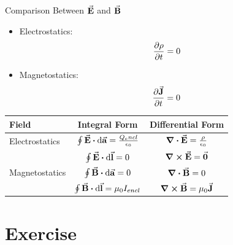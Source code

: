 \documentclass{beamer}
\begin{document}
\begin{frame}{Comparison Between $\va{E}$ and $\va{B}$}
    \begin{itemize}
        \item Electrostatics:
        \begin{equation}
            \pdv{\rho}{t} = 0
        \end{equation}
        \item Magnetostatics:
        \begin{equation}
            \pdv{\va{J}}{t} = 0
        \end{equation}
    \end{itemize}
    \begin{table}[htbp]
        \centering
        \begin{tabular}{lcc}
            \toprule
            Field & Integral Form & Differential Form \\
            \midrule
            Electrostatics & $\oint \va{E}\vdot\dd{\va{a}}=\frac{Q_encl}{\epsilon_0}$ & $\div{\va{E}} = \frac{\rho}{\epsilon_0}$ \\ \addlinespace
                           & $\oint \va{E}\vdot\dd{\va{l}}=0$ & $\curl{\va{E}}=\va{0}$ \\ \addlinespace
            Magnetostatics & $\oint \va{B}\vdot\dd{\va{a}}=0$ & $\div{\va{B}} = 0$ \\ \addlinespace
                           & $\oint \va{B}\vdot\dd{\va{l}}=\mu_0 I_{encl}$ & $\curl{\va{B}}=\mu_0 \va{J}$ \\
            \bottomrule
        \end{tabular}
    \end{table}
\end{frame}


\section{Exercise}
\end{document}
